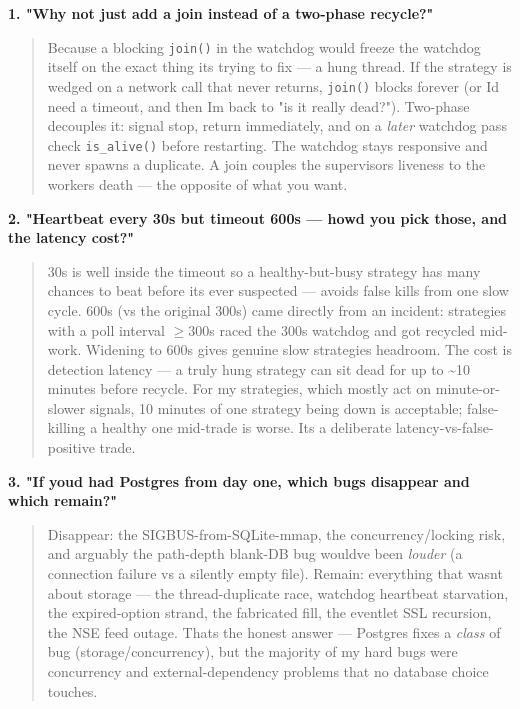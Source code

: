 \documentclass[11pt]{article}
\begin{document}
\textbf{1. "Why not just add a join instead of a two-phase recycle?"}

\begin{quote}
Because a blocking \texttt{join()} in the watchdog would freeze the watchdog itself on the exact thing
it\textquotesingle s trying to fix --- a hung thread. If the strategy is wedged on a network call that never
returns, \texttt{join()} blocks forever (or I\textquotesingle d need a timeout, and then I\textquotesingle m back to "is it really
dead?"). Two-phase decouples it: signal stop, return immediately, and on a \emph{later} watchdog pass
check \texttt{is\_alive()} before restarting. The watchdog stays responsive and never spawns a duplicate.
A join couples the supervisor\textquotesingle s liveness to the worker\textquotesingle s death --- the opposite of what you want.
\end{quote}

\textbf{2. "Heartbeat every 30s but timeout 600s --- how\textquotesingle d you pick those, and the latency cost?"}

\begin{quote}
30s is well inside the timeout so a healthy-but-busy strategy has many chances to beat before it\textquotesingle s
ever suspected --- avoids false kills from one slow cycle. 600s (vs the original 300s) came directly
from an incident: strategies with a poll interval \(\geq\)300s raced the 300s watchdog and got recycled
mid-work. Widening to 600s gives genuine slow strategies headroom. The cost is detection latency ---
a truly hung strategy can sit dead for up to \textasciitilde10 minutes before recycle. For my strategies, which
mostly act on minute-or-slower signals, 10 minutes of one strategy being down is acceptable;
false-killing a healthy one mid-trade is worse. It\textquotesingle s a deliberate latency-vs-false-positive trade.
\end{quote}

\textbf{3. "If you\textquotesingle d had Postgres from day one, which bugs disappear and which remain?"}

\begin{quote}
Disappear: the SIGBUS-from-SQLite-mmap, the concurrency/locking risk, and arguably the path-depth
blank-DB bug would\textquotesingle ve been \emph{louder} (a connection failure vs a silently empty file). Remain:
everything that wasn\textquotesingle t about storage --- the thread-duplicate race, watchdog heartbeat starvation,
the expired-option strand, the fabricated fill, the eventlet SSL recursion, the NSE feed outage.
That\textquotesingle s the honest answer --- Postgres fixes a \emph{class} of bug (storage/concurrency), but the majority
of my hard bugs were concurrency and external-dependency problems that no database choice touches.
\end{quote}
\end{document}
